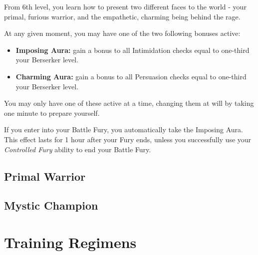 {
	From 6th level, you learn how to present two different faces to the world - your primal, furious warrior, and the empathetic, charming being behind the rage. 

	At any given moment, you may have one of the two following bonuses active:
	\begin{itemize}
		\item {\bf Imposing Aura:} gain a bonus to all Intimidation checks equal to one-third your Berserker level. 
		\item {\bf Charming Aura:} gain a bonus to all Persuasion checks equal to one-third your Berserker level. 
	\end{itemize}
	
	You may only have one of these active at a time, changing them at will by taking one minute to prepare yourself. 
	
	If you enter into your Battle Fury, you automatically take the Imposing Aura. This effect lasts for 1 hour after your Fury ends, unless you successfully use your {\it Controlled Fury} ability to end your Battle Fury.   
}
\subsection*{Primal Warrior}

\subsection*{Mystic Champion}

\section*{Training Regimens}




